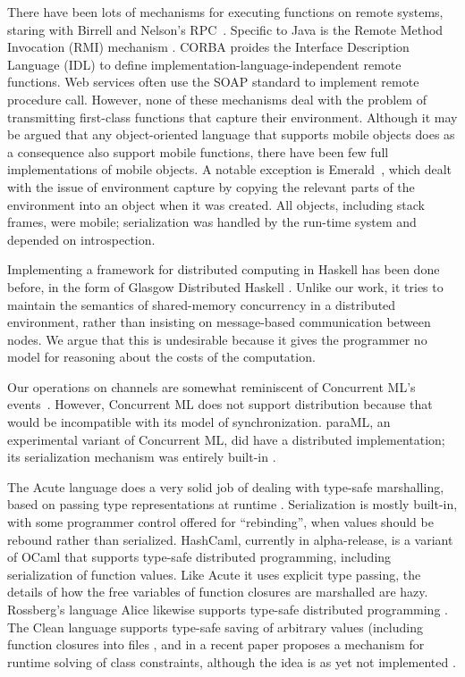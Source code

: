 \documentclass[preprint]{sigplanconf}
\begin{document}
There have been lots of mechanisms for executing functions on remote
systems, staring with Birrell and Nelson's RPC~\cite{birrel1984}.
Specific to Java is the Remote Method Invocation (RMI) mechanism
\cite{javarmi}. CORBA proides the Interface Description Language (IDL)
\cite{corbaidl} to define implementation-language-independent remote
functions. Web services often use the SOAP standard to implement
remote procedure call.  However, none of these mechanisms deal with the problem of transmitting first-class functions that capture their environment.
Although it may be argued that any object-oriented language that supports mobile objects does as a consequence also support mobile functions, there have been few full implementations of mobile objects.  A notable exception is Emerald~\cite{jul1988}, which dealt with the issue of environment capture  by copying the relevant parts of the environment into an object when it was created.  
All objects, including stack frames, were mobile; serialization was handled by the run-time system and depended on introspection.

Implementing a framework for distributed computing in Haskell has been
done before, in the form of Glasgow Distributed Haskell
\cite{gdh2001}. Unlike our work, it tries to maintain the semantics of
shared-memory concurrency in a distributed environment, rather than
insisting on message-based communication between nodes. We argue that this is 
undesirable because it gives the programmer no model for reasoning about the costs of the computation.  

Our operations on channels are somewhat reminiscent of Concurrent ML's events~\cite{reppy:book}.
However, Concurrent ML does not support distribution because that would be incompatible with its
model of synchronization.  paraML, an experimental variant of Concurrent ML, did have
a distributed implementation; its serialization mechanism was entirely built-in \cite{bailey:paraml}.

The Acute language does a very solid job of dealing with type-safe
marshalling, based on passing type representations at runtime
\cite{acute:jfp}.  Serialization is mostly built-in, with some
programmer control offered for ``rebinding'', when values should be
rebound rather than serialized.  HashCaml, currently in alpha-release, is a
variant of OCaml that supports type-safe distributed
programming, including serialization of function values.  Like Acute
it uses explicit type passing, the details of how the free variables
of function closures are marshalled are hazy.  Rossberg's language
Alice likewise supports type-safe distributed programming
\cite{rossberg:alice}.  
The Clean language supports type-safe saving of arbitrary values (including
function closures into files \cite{clean:dynamic-io}, and in a recent
paper proposes a mechanism for runtime solving of class constraints, although
the idea is as yet not implemented
\cite[Sect 4.2]{clean:wgp10}.
\end{document}
